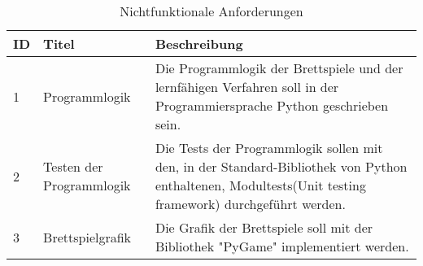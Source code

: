 \begin{table}
\caption{Nichtfunktionale Anforderungen}
\begin{tabular}{ | p{} | p{} | p{} |}
\hline
\ac{ID} & Titel & Beschreibung \\ \hline
1 & Programmlogik & Die Programmlogik der Brettspiele und der lernfähigen Verfahren soll in der Programmiersprache Python geschrieben sein. \\ \hline
2 & Testen der Programmlogik & Die Tests der Programmlogik sollen mit den, in der Standard-Bibliothek von Python enthaltenen, Modultests(Unit testing framework) durchgeführt werden. \\ \hline
3 & Brettspielgrafik & Die Grafik der Brettspiele soll mit der Bibliothek "PyGame" implementiert werden. \\ \hline

\end{tabular}
\label{tab:funktionale_anforderungen}
\end{table}
